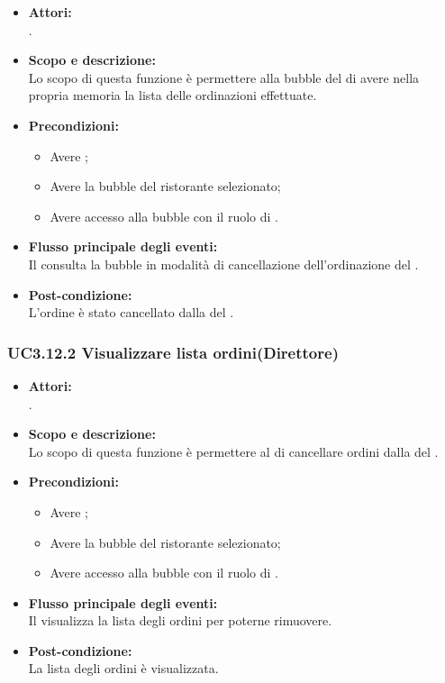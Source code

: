 \begin{itemize}
	\item \textbf{Attori:}
	\\.
	\item \textbf{Scopo e descrizione:} 
	\\Lo scopo di questa funzione è permettere alla bubble del  di avere nella propria memoria la lista delle ordinazioni effettuate.
	\item \textbf{Precondizioni:}
	\begin{itemize}
		\item Avere ;
		\item Avere la bubble del ristorante selezionato;
		\item Avere accesso alla bubble con il ruolo di .
	\end{itemize}
	\item \textbf{Flusso principale degli eventi:}
	\\Il {} consulta la bubble in modalità di cancellazione dell’ordinazione del .
	\item \textbf{Post-condizione:}
	\\L’ordine è stato cancellato dalla  del .
\end{itemize}

\subsubsection{UC3.12.2 Visualizzare lista ordini(Direttore)} \label{UC3.12.2}

\begin{itemize}
	\item \textbf{Attori:}
	\\.
	\item \textbf{Scopo e descrizione:} 
	\\Lo scopo di questa funzione è permettere al  di cancellare ordini dalla  del .
	\item \textbf{Precondizioni:}
	\begin{itemize}
		\item Avere ;
		\item Avere la bubble del ristorante selezionato;
		\item Avere accesso alla bubble con il ruolo di .
	\end{itemize}
	\item \textbf{Flusso principale degli eventi:}
	\\Il {} visualizza la lista degli ordini per poterne rimuovere.
	\item \textbf{Post-condizione:}
	\\La lista degli ordini è visualizzata.
\end{itemize}

